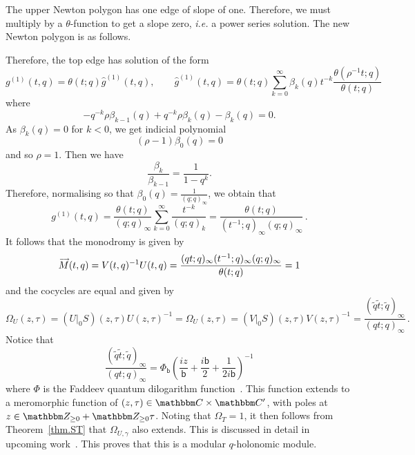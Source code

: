 \documentclass[12pt,reqno]{amsart}
\theoremstyle{definition}
\def\BZ{\mathbbm Z}
\def\BC{\mathbbm C}
\def\ti{\widetilde}
\def\be{\begin{equation}}
\def\ee{\end{equation}}
\def\sfb{\mathsf{b}}
\def\Om{\Omega}
\def\rind{\rho}
\def\vM{\accentset{\longrightarrow}{M}}
\def\sfb{\mathsf{b}}
\begin{document}
The upper Newton polygon has one edge of slope of one. Therefore, we must multiply
by a $\theta$-function to get a slope zero, \emph{i.e.} a power series solution.
The new Newton polygon is as follows.
\begin{center}
\end{center}
Therefore, the top edge has solution of the form
\be
g^{(1)}(t,q)
=
\theta(t;q)\hat{g}^{(1)}(t,q), \qquad \hat{g}^{(1)}(t,q)
=
\theta(t;q)
\sum_{k=0}^{\infty}\beta_{k}(q)t^{-k}\frac{\theta(\rind^{-1}t;q)}{\theta(t;q)}
\ee
where
\be
-q^{-k}\rind\beta_{k-1}(q)+q^{-k}\rind\beta_{k}(q)-\beta_{k}(q)=0.
\ee
As $\beta_{k}(q)=0$ for $k<0$, we get indicial polynomial
\be
(\rind-1)\beta_{0}(q)=0
\ee
and so $\rind=1$. Then we have
\be
\frac{\beta_{k}}{\beta_{k-1}}
=
\frac{1}{1-q^{k}}.
\ee
Therefore, normalising so that $\beta_{0}(q)=\frac{1}{(q;q)_{\infty}}$,
we obtain that
\be
\label{ex1.g1}
g^{(1)}(t,q)
=
\frac{\theta(t;q)}{(q;q)_{\infty}}\sum_{k=0}^{\infty}\frac{t^{-k}}{(q;q)_{k}}
=
\frac{\theta(t;q)}{(t^{-1};q)_{\infty}(q;q)_{\infty}} \,.
\ee
It follows that the monodromy is given by
\be
\vM(t,q)
=
V(t,q)^{-1}U(t,q)
=
\frac{(qt;q)_{\infty}(t^{-1};q)_{\infty}(q;q)_{\infty}}{\theta(t;q)}
=
1 
\ee
and the cocycles are equal and given by 
\be
\Om_{U}(z,\tau)
=
(U|_{0}S)(z,\tau) U(z,\tau)^{-1}
=
\Om_{U}(z,\tau)
=
(V|_{0}S)(z,\tau) V(z,\tau)^{-1}
=
\frac{(\ti q\ti t;\ti q)_{\infty}}{(qt;q)_{\infty}} \,.
\ee
Notice that
\be
\frac{(\ti q\ti t;\ti q)_{\infty}}{(qt;q)_{\infty}}
=
\Phi_{\sfb}\left(\frac{iz}{\sfb}
  +\frac{i\sfb}{2}+\frac{1}{2i\sfb}\right)^{-1}
\ee
where $\Phi$ is the Faddeev quantum dilogarithm function~\cite{Faddeev,
FK-QDL}. This function extends to a meromorphic function of $(z,\tau)\in
\BC \times \BC'$, with poles at $z\in \BZ_{\geq0}+\BZ_{\geq0}\tau$. Noting that $\Omega_{T}=1$,
it then follows from Theorem~\ref{thm.ST} that
$\Om_{U,\gamma}$ also extends. This is discussed in detail in upcoming
work~\cite{GKZ:cocycle}. This proves that this is a modular
$q$-holonomic module.
\end{document}
